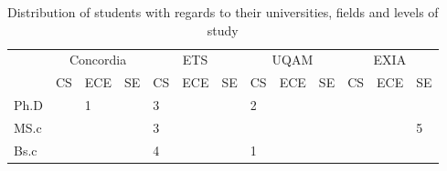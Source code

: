 \begin{table*}[]
\centering
\caption{Distribution of students with regards to their universities, fields and levels of study}
\label{tab:students}
\begin{tabular}{llll|l|l|l|l|l|l|l|l|l}
 & \multicolumn{3}{c}{Concordia} & \multicolumn{3}{c|}{ETS} & \multicolumn{3}{c|}{UQAM} & \multicolumn{3}{c}{EXIA} \\ \cline{2-13} 
 & \multicolumn{1}{l|}{CS} & \multicolumn{1}{l|}{ECE} & SE & CS & ECE & SE & CS & ECE & SE & CS & ECE & SE \\ \hline
\multicolumn{1}{l|}{Ph.D} & \multicolumn{1}{l|}{} & \multicolumn{1}{l|}{1} &  & 3 &  &  & 2 &  &  &  &  &  \\ \hline
\multicolumn{1}{l|}{MS.c} & \multicolumn{1}{l|}{} & \multicolumn{1}{l|}{} &  & 3 &  &  &  &  &  &  &  & 5 \\ \hline
\multicolumn{1}{l|}{Bs.c} & \multicolumn{1}{l|}{} & \multicolumn{1}{l|}{} &  & 4 &  &  & 1 &  &  &  &  &  \\ \hline
\end{tabular}
\end{table*}